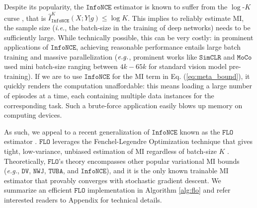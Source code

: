 \documentclass[nohyperref]{article}
\theoremstyle{plain}
\theoremstyle{definition}
\theoremstyle{remark}
\newcommand{\infonce}{\texttt{InfoNCE}}
\newcommand{\TUBA}{\texttt{TUBA}}
\newcommand{\NWJ}{\texttt{NWJ}}
\newcommand{\DV}{\texttt{DV}}
\newcommand{\FLO}{\texttt{FLO}}
\newcommand{\SimCLR}{\texttt{SimCLR}}
\newcommand{\MoCo}{\texttt{MoCo}}
\begin{document}
Despite its popularity, the $\infonce$ estimator is known to suffer from the $\log$-$K$ curse \citep{oord2018representation, chen2021simpler}, that is $\hat{I}_{\infonce}^K(X;Y|g) \leq \log K$.
This implies to reliably estimate MI, the sample size ({\it i.e.}, the batch-size in the training of deep networks) needs to be sufficiently large. While technically possible, this can be very costly: in prominent applications of $\infonce$, achieving reasonable performance entails large batch training and massive parallelization ($\it e.g.$, prominent works like $\SimCLR$ \citep{chen2020simple} and $\MoCo$ \citep{he2020momentum} used mini batch-size ranging between $4k-65k$ for standard vision model pre-training). If we are to use $\infonce$ for the MI term in Eq. (\ref{eq:meta_bound}), it quickly renders the computation unaffordable: this means loading a large number of episodes at a time, each containing multiple data instances for the corresponding task. Such a brute-force application easily blows up memory on computing devices. 


As such, we appeal to a recent generalization of $\infonce$ known as the $\FLO$ estimator \citep{guo2021tight}. $\FLO$ leverages the Fenchel-Legendre Optimization technique that gives tight, low-variance, unbiased estimation of MI regardless of batch-size $K$ \citep{fenchel1949conjugate, tao2019fenchel}. Theoretically, $\FLO$'s theory encompasses other popular variational MI bounds ({\it e.g.}, $\DV$, $\NWJ$, $\TUBA$, and $\infonce$), and it is the only known trainable MI estimator that provably converges with stochastic gradient descent. We summarize an efficient $\FLO$ implementation in Algorithm \ref{alg:flo} and refer interested readers to Appendix for technical details. 

\end{document}

